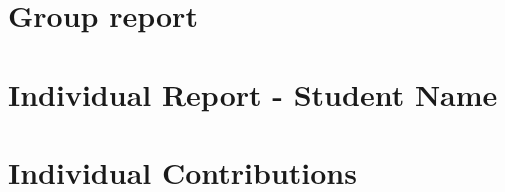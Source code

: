 
\section{Group report}











\newpage


\section{Individual Report - Student Name}











\newpage




\newpage

\section{Individual Contributions}


